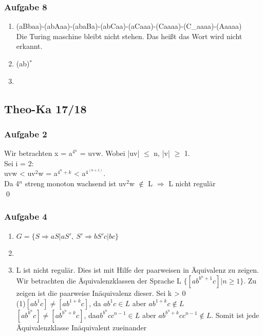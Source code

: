 \documentclass[12pt]{scrartcl}
\begin{document}
\subsubsection{Aufgabe 8}
	\begin{enumerate}
			\item (aBbaa)-(abAaa)-(abaBa)-(abCaa)-(aCaaa)-(Caaaa)-(C\_aaaa)-(Aaaaa) \\
			Die Turing maschine bleibt nicht stehen. Das heißt das Wort wird nicht erkannt.
			\item (ab)$^{*}$
			\item
	\end{enumerate}
	
\subsection{Theo-Ka 17/18}
	
\subsubsection{Aufgabe 2}
	Wir betrachten x = a$^{4{^n}}$ = uvw. Wobei |uv| $\le$ n, |v| $\ge$ 1. \\
	Sei i = 2:\\
	uvw < uv$^{2}$w = a$^{4^{n}+k}$ <  a$^{4^{(n+1)}}$. \\
	Da 4$^{n}$ streng monoton wachsend ist uv$^{2}$w $\notin$ L $\Rightarrow$ L nicht regulär \\
	\qed

\subsubsection{Aufgabe 4}
	\begin{enumerate}
		\item \(G = \{ S \Rightarrow aS| aS',\ S' \Rightarrow bS'c|bc\}\)
		\item
		\item L ist nicht regulär. Dies ist mit Hilfe der paarweisen in Äquivalenz zu zeigen.\\
		Wir betrachten die Äquivalenzklassen der Sprache L \(\{ [ab^{b^n+1}c]| n \ge 1 \}\). Zu zeigen ist die paarweise Inäquivalenz dieser. Sei k > 0\\
		(1)\( [ab^{1}c] \neq [ab^{1+k}c]\), da \(ab^{1}c \in L\) aber \(ab^{1+k}c \notin L\) \\
		\( [ab^{b^n}c] \neq [ab^{b^n+k}c]\), da\( ab^{b^n}cc^{n-1} \in L\) aber \( ab^{b^n+k}cc^{n-1} \notin L\). Somit ist jede Äquivalenzklasse Inäquivalent zueinander 
	\end{enumerate}
	
\end{document}
